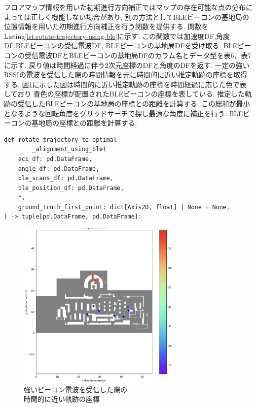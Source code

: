 フロアマップ情報を用いた初期進行方向補正ではマップの存在可能な点の分布によっては正しく機能しない場合があり,
別の方法としてBLEビーコンの基地局の位置情報を用いた初期進行方向補正を行う関数を提供する.
関数をListing\ref{lst:rotate-trajectory-using-ble}に示す.
この関数では加速度DF,角度DF,BLEビーコンの受信電波DF, BLEビーコンの基地局DFを受け取る.
BLEビーコンの受信電波DFとBLEビーコンの基地局DFのカラム名とデータ型を表6，表7に示す.
戻り値は時間経過に伴う2次元座標のDFと角度のDFを返す.
一定の強いRSSIの電波を受信した際の時間情報を元に時間的に近い推定軌跡の座標を取得する.
図\ref{fig:ble-merge}に示した図は時間的に近い推定軌跡の座標を時間経過に応じた色で表しており
青色の座標が配置されたBLEビーコンの座標を表している.
推定した軌跡の受信したBLEビーコンの基地局の座標との距離を計算する.
この総和が最小となるような回転角度をグリッドサーチで探し最適な角度に補正を行う.
BLEビーコンの基地局の座標との距離を計算する.

\begin{lstlisting}[caption={BLEビーコンの基地局の位置情報を使用した初期進行方向補正}, label=lst:rotate-trajectory-using-ble]
def rotate_trajectory_to_optimal
		_alignment_using_ble(
    acc_df: pd.DataFrame,
    angle_df: pd.DataFrame,
    ble_scans_df: pd.DataFrame,
    ble_position_df: pd.DataFrame,
    *,
    ground_truth_first_point: dict[Axis2D, float] | None = None,
) -> tuple[pd.DataFrame, pd.DataFrame]:
\end{lstlisting}


\begin{figure}[ht]
	\centering
	\includegraphics[width=80mm]{image/ble-merge.jpg}
	\caption{強いビーコン電波を受信した際の\\時間的に近い軌跡の座標}    \label{fig:ble-merge}
\end{figure}

